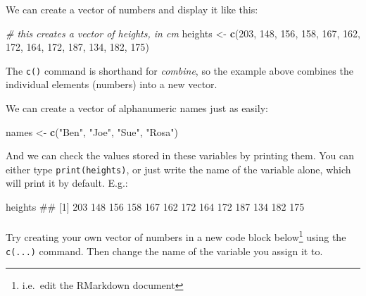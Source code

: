 \documentclass[]{article}
\newenvironment{Shaded}{\begin{snugshade}}{\end{snugshade}}
\newcommand{\KeywordTok}[1]{\textcolor[rgb]{0.13,0.29,0.53}{\textbf{#1}}}
\newcommand{\DecValTok}[1]{\textcolor[rgb]{0.00,0.00,0.81}{#1}}
\newcommand{\StringTok}[1]{\textcolor[rgb]{0.31,0.60,0.02}{#1}}
\newcommand{\CommentTok}[1]{\textcolor[rgb]{0.56,0.35,0.01}{\textit{#1}}}
\newcommand{\NormalTok}[1]{#1}
\let\oldparagraph\paragraph
\renewcommand{\paragraph}[1]{\oldparagraph{#1}\mbox{}}
\let\rmarkdownfootnote\footnote%
\def\footnote{\protect\rmarkdownfootnote}
\theoremstyle{definition}
\theoremstyle{definition}
\theoremstyle{definition}
\theoremstyle{remark}
\begin{document}
We can create a vector of numbers and display it like this:

\begin{Shaded}
\begin{Highlighting}[]
\CommentTok{# this creates a vector of heights, in cm}
\NormalTok{heights <-}\StringTok{ }\KeywordTok{c}\NormalTok{(}\DecValTok{203}\NormalTok{, }\DecValTok{148}\NormalTok{, }\DecValTok{156}\NormalTok{, }\DecValTok{158}\NormalTok{, }\DecValTok{167}\NormalTok{, }
             \DecValTok{162}\NormalTok{, }\DecValTok{172}\NormalTok{, }\DecValTok{164}\NormalTok{, }\DecValTok{172}\NormalTok{, }\DecValTok{187}\NormalTok{, }
             \DecValTok{134}\NormalTok{, }\DecValTok{182}\NormalTok{, }\DecValTok{175}\NormalTok{)}
\end{Highlighting}
\end{Shaded}

The \texttt{c()} command is shorthand for \emph{combine}, so the example
above combines the individual elements (numbers) into a new vector.

We can create a vector of alphanumeric names just as easily:

\begin{Shaded}
\begin{Highlighting}[]
\NormalTok{names <-}\StringTok{ }\KeywordTok{c}\NormalTok{(}\StringTok{"Ben"}\NormalTok{, }\StringTok{"Joe"}\NormalTok{, }\StringTok{"Sue"}\NormalTok{, }\StringTok{"Rosa"}\NormalTok{)}
\end{Highlighting}
\end{Shaded}

And we can check the values stored in these variables by printing them.
You can either type \texttt{print(heights)}, or just write the name of
the variable alone, which will print it by default. E.g.:

\begin{Shaded}
\begin{Highlighting}[]
\NormalTok{heights }
\NormalTok{##  [1] 203 148 156 158 167 162 172 164 172 187 134 182 175}
\end{Highlighting}
\end{Shaded}

\paragraph{}\label{section-3}

Try creating your own vector of numbers in a new code block
below\footnote{i.e.~edit the RMarkdown document} using the
\texttt{c(...)} command. Then change the name of the variable you assign
it to.
\end{document}
